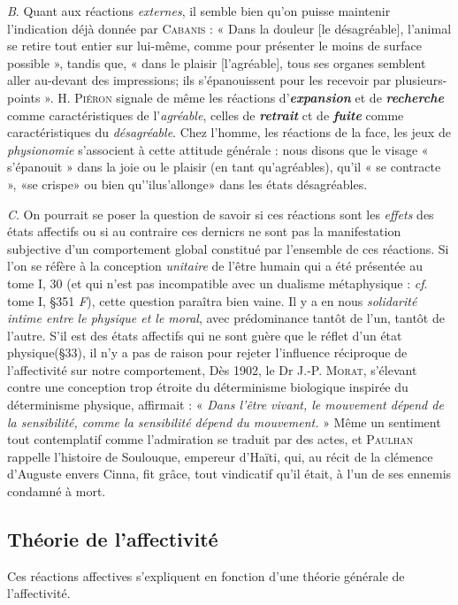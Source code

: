 {\it B}. Quant aux réactions {\it externes}, il semble bien qu’on puisse maintenir
l'indication déjà donnée par \textsc{Cabanis} : « Dans la douleur [le désagréable],
l’animal se retire tout entier sur lui-même, comme pour
présenter le moins de surface possible », tandis que, « dans le plaisir
[l’agréable], tous ses organes semblent aller au-devant des impressions;
ils s’épanouissent pour les recevoir par plusieurs-points ». H. \textsc{Piéron}
signale de même les réactions d'\textbf{\textit {expansion}} et de
\textbf{\textit {recherche}} comme
caractéristiques de l’{\it agréable}, celles de \textbf{\textit {retrait}} ct de
\textbf{\textit {fuite}} comme caractéristiques
du {\it désagréable}. Chez l’homme, les réactions de la face,
les jeux de {\it physionomie} s'associent à cette attitude générale : nous
disons que le visage « s’épanouit » dans la joie ou le plaisir (en tant
qu’agréables), qu'il « se contracte », «se crispe» ou bien qu'’ilus’allonge»
dans les états désagréables.

{\it C}. On pourrait se poser la question de savoir si ces réactions sont
les {\it effets} des états affectifs ou si au contraire ces dernicrs ne sont pas
la manifestation subjective d’un comportement global constitué par
l’ensemble de ces réactions. Si l’on se réfère à la conception {\it unitaire}
de l’être humain qui a été présentée au tome I, 30 (et qui n’est pas
incompatible avec un dualisme métaphysique : {\it cf}. tome I, \S 351 {\it F}),
cette question paraîtra bien vaine. Il y a en nous {\it solidarité intime
entre le physique et le moral}, avec prédominance tantôt de l’un, tantôt
de l’autre. S'il est des états affectifs qui ne sont guère que le réflet
d’un état physique(\S 33), il n’y a pas de raison pour rejeter l’influence
réciproque de l’affectivité sur notre comportement, Dès 1902, le
Dr J.-P. \textsc{Morat}, s’élevant contre une conception trop étroite du
déterminisme biologique inspirée du déterminisme physique, affirmait :
« {\it Dans l'être vivant, le mouvement dépend de la sensibilité,
comme la sensibilité dépend du mouvement.} » Même un sentiment tout
contemplatif comme l'admiration se traduit par des actes, et
\textsc{Paulhan} rappelle l’histoire de Soulouque, empereur d'Haïti, qui,
au récit de la clémence d’Auguste envers Cinna, fit grâce, tout
vindicatif qu’il était, à l’un de ses ennemis condamné à mort.

\subsection{Théorie de l’affectivité}%
Ces réactions affectives s'expliquent
en fonction d’une théorie générale de l’affectivité.

